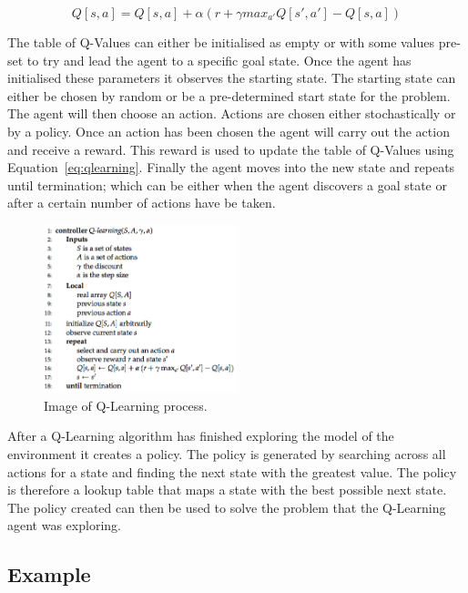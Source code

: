 \begin{equation} \label{eq:qlearning}
Q[s,a] = Q[s,a] + {\alpha}(r+ {\gamma}max_{a'} Q[s',a'] - Q[s,a])
\end{equation}

The table of Q-Values can either be initialised as empty or with some values pre-set to try and lead the agent to a specific goal state. Once the agent has initialised these parameters it observes the starting state. The starting state can either be chosen by random or be a pre-determined start state for the problem. The agent will then choose an action. Actions are chosen either stochastically or by a policy. Once an action has been chosen the agent will carry out the action and receive a reward. This reward is used to update the table of Q-Values using Equation~\ref{eq:qlearning}. Finally the agent moves into the new state and repeats until termination; which can be either when the agent discovers a goal state or after a certain number of actions have be taken.

\begin{figure}[H]
  \begin{center}
    	  \includegraphics[width=0.5\textwidth]{figures/q-learning.jpg}
    \end{center}
    \caption{Image of Q-Learning process.}
    \label{fig:qlearning}
\end{figure}

After a Q-Learning algorithm has finished exploring the model of the environment it creates a policy. The policy is generated by searching across all actions for a state and finding the next state with the greatest value. The policy is therefore a lookup table that maps a state with the best possible next state. The policy created can then be used to solve the problem that the Q-Learning agent was exploring.~\cite{poole2010artificial}

\subsection{Example} \label{example}
